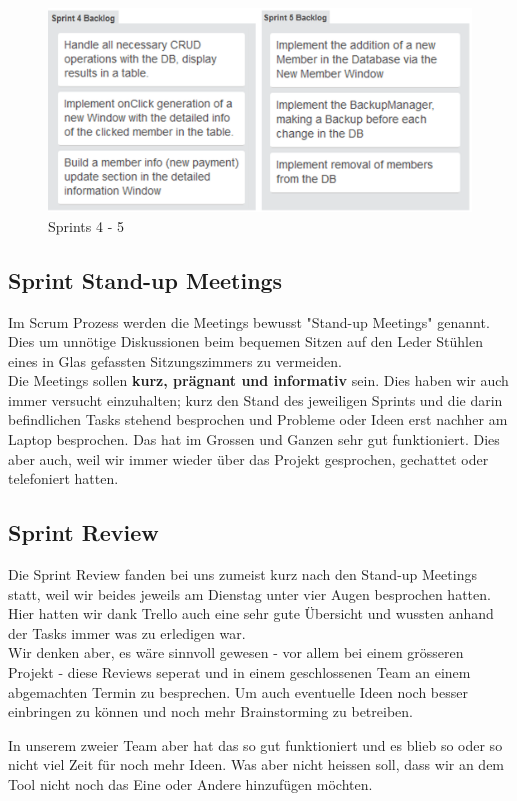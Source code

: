 \documentclass{article}
\begin{document}
\begin{figure}[h]
	\centering
	\includegraphics[width=0.4\paperwidth]{Sprint4-5}
	\caption{Sprints 4 - 5}
\end{figure}

\subsection{Sprint Stand-up Meetings}
Im Scrum Prozess werden die Meetings bewusst "Stand-up Meetings" genannt. Dies um unnötige Diskussionen  beim bequemen Sitzen auf den Leder Stühlen eines in Glas gefassten Sitzungszimmers zu vermeiden.\\
Die Meetings sollen \textbf{kurz, prägnant und informativ} sein.
Dies haben wir auch immer versucht einzuhalten; kurz den Stand des jeweiligen Sprints und die darin befindlichen Tasks stehend besprochen und Probleme oder Ideen erst nachher am Laptop besprochen.
Das hat im Grossen und Ganzen sehr gut funktioniert. Dies aber auch, weil wir immer wieder über das Projekt gesprochen, gechattet oder telefoniert hatten.

\subsection{Sprint Review}
Die Sprint Review fanden bei uns zumeist kurz nach den Stand-up Meetings statt, weil wir beides jeweils am Dienstag unter vier Augen besprochen hatten.
Hier hatten wir dank Trello auch eine sehr gute Übersicht und wussten anhand der Tasks immer was zu erledigen war.\\
Wir denken aber, es wäre sinnvoll gewesen - vor allem bei einem grösseren Projekt - diese Reviews seperat und in einem geschlossenen Team an einem abgemachten Termin zu besprechen. Um auch eventuelle Ideen noch besser einbringen zu können und noch mehr Brainstorming zu betreiben.

In unserem zweier Team aber hat das so gut funktioniert und es blieb so oder so nicht viel Zeit für noch mehr Ideen. Was aber nicht heissen soll, dass wir an dem Tool nicht noch das Eine oder Andere hinzufügen möchten.
\end{document}
